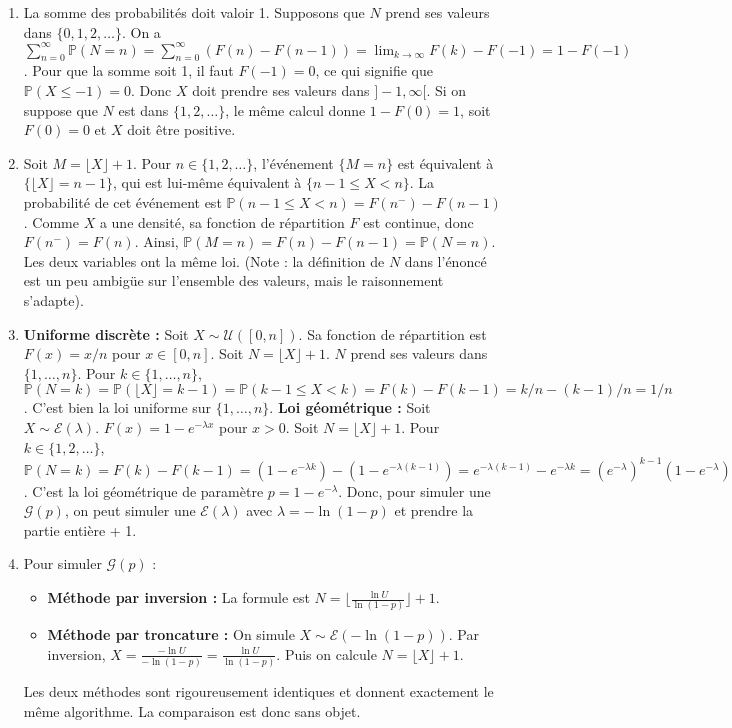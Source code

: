 \documentclass[solutions]{exercices}
\begin{document}
\begin{solution}
\begin{enumerate}
    \item La somme des probabilités doit valoir 1. Supposons que $N$ prend ses valeurs dans $\{0, 1, 2, \dots\}$. On a $\sum_{n=0}^\infty \mathbb{P}(N=n) = \sum_{n=0}^\infty (F(n) - F(n-1)) = \lim_{k\to\infty} F(k) - F(-1) = 1 - F(-1)$. Pour que la somme soit 1, il faut $F(-1)=0$, ce qui signifie que $\mathbb{P}(X \le -1) = 0$. Donc $X$ doit prendre ses valeurs dans $]-1, \infty[$. Si on suppose que $N$ est dans $\{1, 2, \dots\}$, le même calcul donne $1 - F(0)=1$, soit $F(0)=0$ et $X$ doit être positive.
    \item Soit $M = \lfloor X \rfloor + 1$. Pour $n \in \{1, 2, \dots\}$, l'événement $\{M=n\}$ est équivalent à $\{\lfloor X \rfloor = n-1\}$, qui est lui-même équivalent à $\{n-1 \le X < n\}$. La probabilité de cet événement est $\mathbb{P}(n-1 \le X < n) = F(n^-) - F(n-1)$. Comme $X$ a une densité, sa fonction de répartition $F$ est continue, donc $F(n^-)=F(n)$. Ainsi, $\mathbb{P}(M=n) = F(n) - F(n-1) = \mathbb{P}(N=n)$. Les deux variables ont la même loi. (Note : la définition de $N$ dans l'énoncé est un peu ambigüe sur l'ensemble des valeurs, mais le raisonnement s'adapte).
    \item \textbf{Uniforme discrète :} Soit $X \sim \mathcal{U}([0,n])$. Sa fonction de répartition est $F(x) = x/n$ pour $x \in [0,n]$. Soit $N = \lfloor X \rfloor + 1$. $N$ prend ses valeurs dans $\{1, \dots, n\}$. Pour $k \in \{1, \dots, n\}$, $\mathbb{P}(N=k) = \mathbb{P}(\lfloor X \rfloor=k-1) = \mathbb{P}(k-1 \le X < k) = F(k) - F(k-1) = k/n - (k-1)/n = 1/n$. C'est bien la loi uniforme sur $\{1, \dots, n\}$.
    \textbf{Loi géométrique :} Soit $X \sim \mathcal{E}(\lambda)$. $F(x) = 1 - e^{-\lambda x}$ pour $x>0$. Soit $N = \lfloor X \rfloor + 1$. Pour $k \in \{1, 2, \dots\}$, $\mathbb{P}(N=k) = F(k)-F(k-1) = (1-e^{-\lambda k}) - (1-e^{-\lambda(k-1)}) = e^{-\lambda(k-1)} - e^{-\lambda k} = (e^{-\lambda})^{k-1}(1-e^{-\lambda})$. C'est la loi géométrique de paramètre $p=1-e^{-\lambda}$. Donc, pour simuler une $\mathcal{G}(p)$, on peut simuler une $\mathcal{E}(\lambda)$ avec $\lambda = -\ln(1-p)$ et prendre la partie entière + 1.
    \item Pour simuler $\mathcal{G}(p)$ :
    \begin{itemize}
        \item \textbf{Méthode par inversion :} La formule est $N = \lfloor \frac{\ln U}{\ln(1-p)} \rfloor + 1$.
        \item \textbf{Méthode par troncature :} On simule $X \sim \mathcal{E}(-\ln(1-p))$. Par inversion, $X = \frac{-\ln U}{-\ln(1-p)} = \frac{\ln U}{\ln(1-p)}$. Puis on calcule $N = \lfloor X \rfloor + 1$.
    \end{itemize}
    Les deux méthodes sont rigoureusement identiques et donnent exactement le même algorithme. La comparaison est donc sans objet.
\end{enumerate}
\end{solution}
\end{document}

